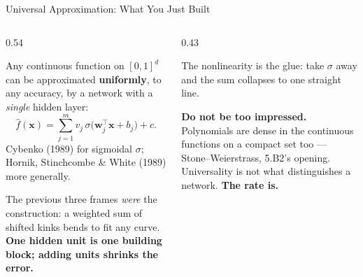\begin{frame}{Universal Approximation: What You Just Built}
\begin{columns}[T]
\begin{column}{0.54\textwidth}
\begin{conceptbox}[title=\textbf{Universal approximation}]\small
Any continuous function on $[0,1]^{d}$ can be approximated \textbf{uniformly}, to any accuracy, by a network with a \emph{single} hidden layer:
\[
  \hat f(\mathbf{x})=\sum_{j=1}^{m}v_j\,\sigma\bigl(\mathbf{w}_j^{\top}\mathbf{x}+b_j\bigr)+c .
\]
Cybenko (1989) for sigmoidal $\sigma$; Hornik, Stinchcombe \& White (1989) more generally.
\end{conceptbox}
\smallskip
\small
The previous three frames \emph{were} the construction: a weighted sum of shifted kinks bends to fit any curve. \textbf{One hidden unit is one building block; adding units shrinks the error.}
\end{column}
\begin{column}{0.43\textwidth}
\begin{takeawaybox}\small
The nonlinearity is the glue: take $\sigma$ away and the sum collapses to one straight line.
\end{takeawaybox}
\medskip
\begin{examplebox}\footnotesize
\textbf{Do not be too impressed.} Polynomials are dense in the continuous functions on a compact set too --- Stone--Weierstrass, 5.B2's opening. Universality is not what distinguishes a network. \textbf{The rate is.}
\end{examplebox}
\end{column}
\end{columns}
\vspace{1mm}
\end{frame}

